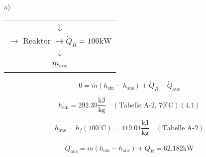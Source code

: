 a) \\
\begin{center}
\begin{tabular}{|c|}
\hline
\begin{minipage}{0.4\textwidth}
\centering
\(\dot{m}_{\text{ein}}\) \\
\(\downarrow\) \\
\(\rightarrow\) Reaktor \(\rightarrow \dot{Q}_R = 100 \text{kW}\) \\
\(\downarrow\) \\
\(\dot{m}_{\text{aus}}\) \\
\end{minipage} \\
\hline
\end{tabular}
\end{center}

\[
0 = \dot{m} (h_{\text{ein}} - h_{\text{aus}}) + \dot{Q}_R - \dot{Q}_{\text{aus}}
\]

\[
h_{\text{ein}} = 292.39 \frac{\text{kJ}}{\text{kg}} \quad (\text{Tabelle A-2, 70}^\circ\text{C}) (4.1)
\]

\[
h_{\text{aus}} = h_f (100^\circ\text{C}) = 419.04 \frac{\text{kJ}}{\text{kg}} \quad (\text{Tabelle A-2})
\]

\[
\dot{Q}_{\text{aus}} = \dot{m} (h_{\text{ein}} - h_{\text{aus}}) + \dot{Q}_R = 62.182 \text{kW}
\]